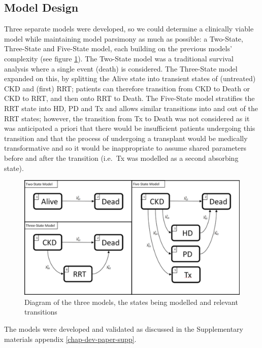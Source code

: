\documentclass[12pt,PhD,twoside,openright]{muthesis}
\begin{document}
\hypertarget{model-design}{%
\subsection{Model Design}\label{model-design}}

Three separate models were developed, so we could determine a clinically viable model while maintaining model parsimony as much as possible: a Two-State, Three-State and Five-State model, each building on the previous models' complexity (see figure \ref{fig:State-Diagram}). The Two-State model was a traditional survival analysis where a single event (death) is considered. The Three-State model expanded on this, by splitting the Alive state into transient states of (untreated) CKD and (first) RRT; patients can therefore transition from CKD to Death or CKD to RRT, and then onto RRT to Death. The Five-State model stratifies the RRT state into HD, PD and Tx and allows similar transitions into and out of the RRT states; however, the transition from Tx to Death was not considered as it was anticipated a priori that there would be insufficient patients undergoing this transition and that the process of undergoing a transplant would be medically transformative and so it would be inappropriate to assume shared parameters before and after the transition (i.e.~Tx was modelled as a second absorbing state).
\begin{figure}

{\centering \includegraphics[width=0.9\linewidth]{figure/Dev_Paper_State_Diagrams} 

}

\caption{Diagram of the three models, the states being modelled and relevant transitions}\label{fig:State-Diagram}
\end{figure}
The models were developed and validated as discussed in the Supplementary materials appendix \ref{chap-dev-paper-supp}.
\end{document}
